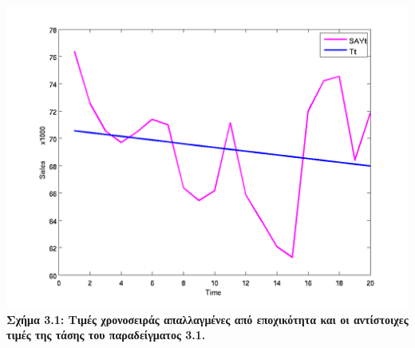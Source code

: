 \begin{table} [h]
\begin{center}
\begin{tabular}{|c|c|c|c|c|c|c|c|}
      \hline
    \end{tabular}
  \end{center}
\end{table}

\begin{center}
\includegraphics[scale=0.7]{graff4.png}\\   
\textbf{Σχήμα 3.1: Τιμές χρονοσειράς απαλλαγμένες από εποχικότητα και οι αντίστοιχες τιμές της τάσης του παραδείγματος 3.1.}
\end{center}

